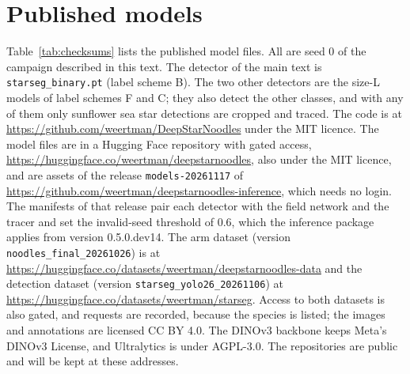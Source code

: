 \section*{Published models}

Table~\ref{tab:checksums} lists the published model files.
All are seed 0 of the campaign described in this text.
The detector of the main text is \texttt{starseg\_binary.pt} (label scheme B).
The two other detectors are the size-L models of label schemes F and C; they also detect the other classes, and with any of them only sunflower sea star detections are cropped and traced.
The code is at \url{https://github.com/weertman/DeepStarNoodles} under the MIT licence.
The model files are in a Hugging Face repository with gated access, \url{https://huggingface.co/weertman/deepstarnoodles}, also under the MIT licence, and are assets of the release \texttt{models-20261117} of \url{https://github.com/weertman/deepstarnoodles-inference}, which needs no login.
The manifests of that release pair each detector with the field network and the tracer and set the invalid-seed threshold of 0.6, which the inference package applies from version 0.5.0.dev14.
The arm dataset (version \texttt{noodles\_final\_20261026}) is at \url{https://huggingface.co/datasets/weertman/deepstarnoodles-data} and the detection dataset (version \texttt{starseg\_yolo26\_20261106}) at \url{https://huggingface.co/datasets/weertman/starseg}.
Access to both datasets is also gated, and requests are recorded, because the species is listed; the images and annotations are licensed CC BY 4.0.
The DINOv3 backbone keeps Meta's DINOv3 License, and Ultralytics is under AGPL-3.0.
The repositories are public and will be kept at these addresses.

